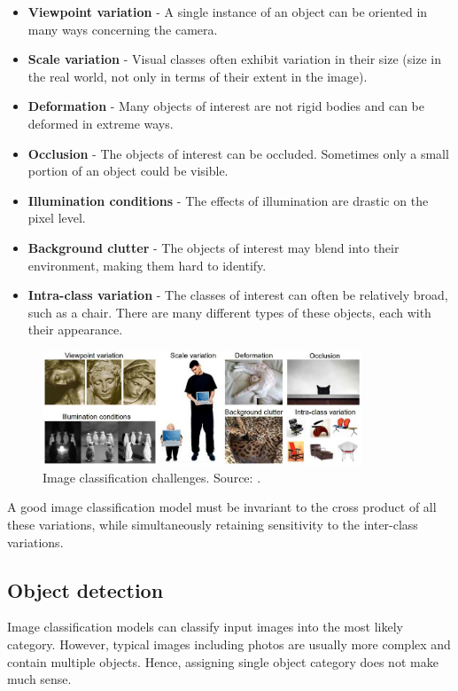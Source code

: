         \begin{itemize}
            \item \textbf{Viewpoint variation} - A single instance of an object can be oriented in many ways concerning the camera.
            \item \textbf{Scale variation} - Visual classes often exhibit variation in their size (size in the real world, not only in terms of their extent in the image).
            \item \textbf{Deformation} - Many objects of interest are not rigid bodies and can be deformed in extreme ways.
            \item \textbf{Occlusion} - The objects of interest can be occluded. Sometimes only a small portion of an object could be visible.
            \item \textbf{Illumination conditions} - The effects of illumination are drastic on the pixel level.
            \item \textbf{Background clutter} - The objects of interest may blend into their environment, making them hard to identify.
            \item \textbf{Intra-class variation} - The classes of interest can often be relatively broad, such as a chair. There are many different types of these objects, each with their appearance.
        \end{itemize}
        
        \begin{figure}[ht]
            \centering
            \includegraphics[width=0.85\textwidth]{resources/image_classification_challenges.png}
            \caption{Image classification challenges. Source: \cite{cs231n}.}
            \label{fig:image_classification_challenges}
        \end{figure}
        
         A good image classification model must be invariant to the cross product of all these variations, while simultaneously retaining sensitivity to the inter-class variations. \cite{cs231n}
         
    \subsection{Object detection}
        Image classification models can classify input images into the most likely category. However, typical images including photos are usually more complex and contain multiple objects. Hence, assigning single object category does not make much sense.
        
